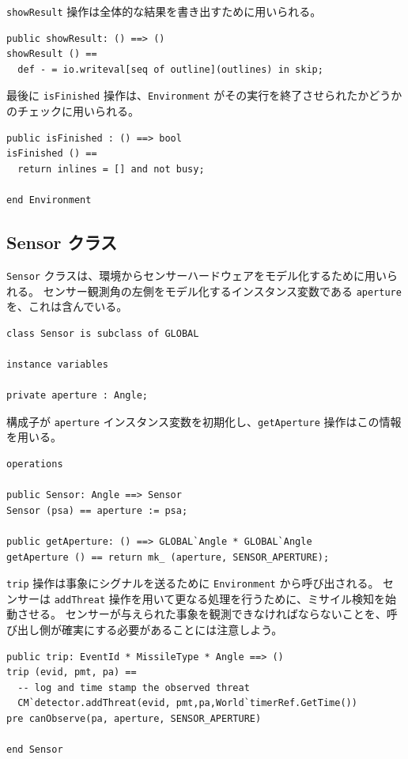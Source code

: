 \documentclass[\pformat,12pt]{jreport}
\begin{document}
 \texttt{showResult} 操作は全体的な結果を書き出すために用いられる。

\begin{lstlisting}
public showResult: () ==> ()
showResult () ==
  def - = io.writeval[seq of outline](outlines) in skip;
\end{lstlisting}

最後に \texttt{isFinished} 操作は、\texttt{Environment} がその実行を終了させられたかどうかのチェックに用いられる。
\newpage

\begin{lstlisting}
public isFinished : () ==> bool
isFinished () == 
  return inlines = [] and not busy;

end Environment
\end{lstlisting}

\subsection{Sensor クラス}

 \texttt{Sensor} クラスは、環境からセンサーハードウェアをモデル化するために用いられる。
センサー観測角の左側をモデル化するインスタンス変数である \texttt{aperture}を、これは含んでいる。

\begin{lstlisting}
class Sensor is subclass of GLOBAL

instance variables

private aperture : Angle;
\end{lstlisting}

構成子が \texttt{aperture} インスタンス変数を初期化し、\texttt{getAperture} 操作はこの情報を用いる。

\begin{lstlisting}
operations

public Sensor: Angle ==> Sensor
Sensor (psa) == aperture := psa;

public getAperture: () ==> GLOBAL`Angle * GLOBAL`Angle
getAperture () == return mk_ (aperture, SENSOR_APERTURE);
\end{lstlisting}

 \texttt{trip} 操作は事象にシグナルを送るために \texttt{Environment} から呼び出される。
センサーは \texttt{addThreat} 操作を用いて更なる処理を行うために、ミサイル検知を始動させる。
センサーが与えられた事象を観測できなければならないことを、呼び出し側が確実にする必要があることには注意しよう。

\begin{lstlisting}
public trip: EventId * MissileType * Angle ==> ()
trip (evid, pmt, pa) ==
  -- log and time stamp the observed threat
  CM`detector.addThreat(evid, pmt,pa,World`timerRef.GetTime())
pre canObserve(pa, aperture, SENSOR_APERTURE)

end Sensor
\end{lstlisting}
\end{document}
